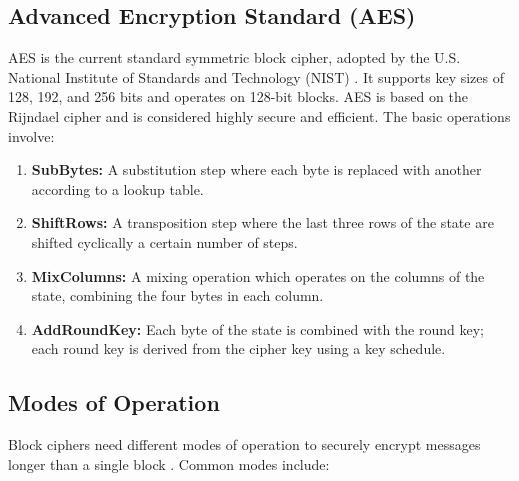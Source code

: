 \documentclass{report}
\begin{document}
\subsection{Advanced Encryption Standard (AES)}
\label{subsec:aes}

AES is the current standard symmetric block cipher, adopted by the U.S. National Institute of Standards and Technology (NIST) \cite{nist_aes}.  It supports key sizes of 128, 192, and 256 bits and operates on 128-bit blocks.  AES is based on the Rijndael cipher and is considered highly secure and efficient. The basic operations involve:
\begin{enumerate}
    \item \textbf{SubBytes:} A substitution step where each byte is replaced with another according to a lookup table.
    \item \textbf{ShiftRows:} A transposition step where the last three rows of the state are shifted cyclically a certain number of steps.
        \item \textbf{MixColumns:} A mixing operation which operates on the columns of the state, combining the four bytes in each column.
    \item \textbf{AddRoundKey:} Each byte of the state is combined with the round key; each round key is derived from the cipher key using a key schedule.
\end{enumerate}

\subsection{Modes of Operation}
\label{subsec:modes-of-operation}

Block ciphers need different modes of operation to securely encrypt messages longer than a single block \cite{dworkin}.  Common modes include:
\end{document}
